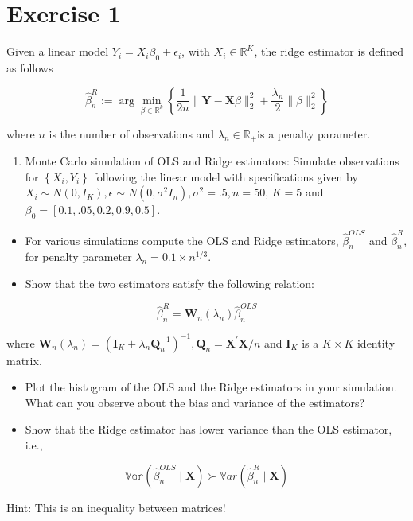 \section{Exercise 1}
Given a linear model $Y_{i}=X_{i} \beta_{0}+\epsilon_{i}$, with $X_{i} \in \mathbb{R}^{K}$, the ridge estimator is defined as follows


\begin{equation}
\hat{\beta}_{n}^{R}:=\arg \min _{\beta \in \mathbb{R}^{k}}\left\{\frac{1}{2 n}\|\boldsymbol{Y}-\boldsymbol{X} \beta\|_{2}^{2}+\frac{\lambda_{n}}{2}\|\beta\|_{2}^{2}\right\} \label{eq:beta-Hat}
\end{equation}


where $n$ is the number of observations and $\lambda_{n} \in \mathbb{R}_{+}$is a penalty parameter.

\begin{enumerate}
  \item Monte Carlo simulation of OLS and Ridge estimators: Simulate observations for $\left\{X_{i}, Y_{i}\right\}$ following the linear model with specifications given by $X_{i} \sim N\left(0, I_{K}\right), \epsilon \sim N\left(0, \sigma^{2} I_{n}\right), \sigma^{2}=.5, n=50$, $K=5$ and $\beta_{0}=[0.1, .05,0.2,0.9,0.5]$.
\end{enumerate}

\begin{itemize}
  \item For various simulations compute the OLS and Ridge estimators, $\hat{\beta}_{n}^{O L S}$ and $\hat{\beta}_{n}^{R}$, for penalty parameter $\lambda_{n}=0.1 \times n^{1 / 3}$.
  \item Show that the two estimators satisfy the following relation:
\end{itemize}

$$
\hat{\beta}_{n}^{R}=\boldsymbol{W}_{n}\left(\lambda_{n}\right) \hat{\beta}_{n}^{O L S}
$$

where $\boldsymbol{W}_{n}\left(\lambda_{n}\right)=\left(\boldsymbol{I}_{K}+\lambda_{n} \boldsymbol{Q}_{n}^{-1}\right)^{-1}, \boldsymbol{Q}_{n}=\boldsymbol{X}^{\prime} \boldsymbol{X} / n$ and $\boldsymbol{I}_{K}$ is a $K \times K$ identity matrix.

\begin{itemize}
  \item Plot the histogram of the OLS and the Ridge estimators in your simulation. What can you observe about the bias and variance of the estimators?
  \item Show that the Ridge estimator has lower variance than the OLS estimator, i.e.,
\end{itemize}

$$
\mathbb{V a r}\left(\hat{\beta}_{n}^{O L S} \mid \boldsymbol{X}\right) \succ \mathbb{V} a r\left(\hat{\beta}_{n}^{R} \mid \boldsymbol{X}\right)
$$

Hint: This is an inequality between matrices!
\label{sec:sec1}

